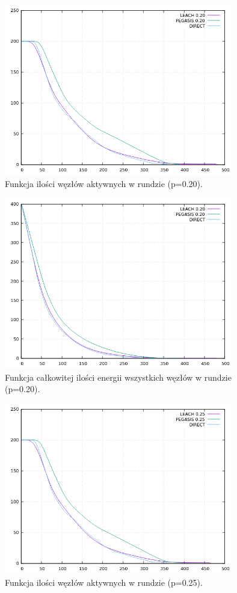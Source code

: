 \documentclass[a4paper,12pt,twoside,openany]{report}
\begin{document}
\begin{figure}[H]
 \centering
 \includegraphics[width=10cm]{images/gnuplot/test_4/nodes_in_round_p020.png}
 \caption{Funkcja ilości węzłów aktywnych w rundzie (p=0.20).}
\end{figure}

\begin{figure}[H]
 \centering
 \includegraphics[width=10cm]{images/gnuplot/test_4/energy_in_round_p020.png}
 \caption{Funkcja całkowitej ilości energii wszystkich węzłów w rundzie (p=0.20).}
\end{figure}

\begin{figure}[H]
 \centering
 \includegraphics[width=10cm]{images/gnuplot/test_4/nodes_in_round_p025.png}
 \caption{Funkcja ilości węzłów aktywnych w rundzie (p=0.25).}
\end{figure}
\end{document}
